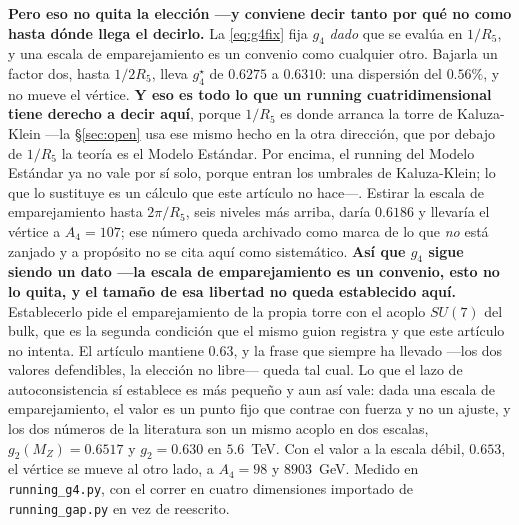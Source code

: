 \documentclass[11pt,a4paper]{article}
\newcommand{\su}[1]{SU(#1)}
\begin{document}
\noindent \textbf{Pero eso no quita la elección ---y conviene decir tanto por qué no como hasta
dónde llega el decirlo.} La
\eqref{eq:g4fix} fija $g_4$ \emph{dado} que se evalúa en $1/R_5$, y una escala de emparejamiento
es un convenio como cualquier otro. Bajarla un factor dos, hasta $1/2R_5$, lleva $g_4^\star$ de
$0.6275$ a $0.6310$: una dispersión del $0.56\%$, y no mueve el vértice. \textbf{Y eso es todo lo
que un running cuatridimensional tiene derecho a decir aquí}, porque $1/R_5$ es donde arranca la
torre de Kaluza-Klein ---la \S\ref{sec:open} usa ese mismo hecho en la otra dirección, que por
debajo de $1/R_5$ la teoría es el Modelo Estándar. Por encima, el running del Modelo Estándar
ya no vale por sí solo, porque entran los umbrales de Kaluza-Klein; lo que lo sustituye es un
cálculo que este artículo no hace---. Estirar la escala de emparejamiento hasta $2\pi/R_5$, seis
niveles más arriba, daría $0.6186$ y llevaría el vértice a $A_4=107$; ese número queda archivado
como marca de lo que \emph{no} está zanjado y a propósito no se cita aquí como sistemático.
\textbf{Así que $g_4$ sigue siendo un dato ---la escala de emparejamiento es un convenio, esto no
lo quita, y el tamaño de esa libertad no queda establecido aquí.} Establecerlo pide el
emparejamiento de la propia torre con el acoplo $\su7$ del bulk, que es la segunda condición que
el mismo guion registra y que este artículo no intenta. El artículo mantiene $0.63$, y la frase que siempre ha llevado ---los dos valores
defendibles, la elección no libre--- queda tal cual. Lo que el lazo de autoconsistencia sí
establece es más pequeño y aun así vale: dada una escala de
emparejamiento, el valor es un punto fijo que contrae con fuerza y no un ajuste, y los dos números
de la literatura son un mismo acoplo en dos escalas, $g_2(M_Z)=0.6517$ y $g_2=0.630$ en $5.6$~TeV.
Con el valor a la escala débil, $0.653$, el vértice se mueve al otro lado, a $A_4=98$ y $8903$~GeV.
Medido en \texttt{running\_\allowbreak g4.py}, con el correr en cuatro dimensiones importado de
\texttt{running\_\allowbreak gap.py} en vez de reescrito.
\end{document}
